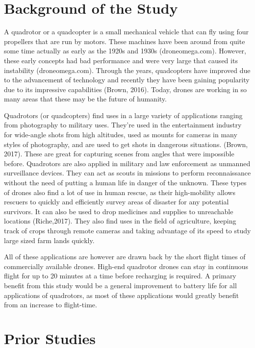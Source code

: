 \section{Background of the Study}

A quadrotor or a quadcopter is a small mechanical vehicle that can fly using four propellers that are run by motors. These machines have been around from quite some time actually as early as the 1920s and 1930s (droneomega.com). However, these early concepts had bad performance and were very large that caused its instability (droneomega.com). Through the years, quadcopters have improved due to the advancement of technology and recently they have been gaining popularity due to its impressive capabilities (Brown, 2016). Today, drones are working in so many areas that these may be the future of humanity.

Quadrotors (or quadcopters) find uses in a large variety of applications ranging from photography to military uses. They’re used in the entertainment industry for wide-angle shots from high altitudes, used as mounts for cameras in many styles of photography, and are used to get shots in dangerous situations. (Brown, 2017).  These are great for capturing scenes from angles that were impossible before. Quadrotors are also applied in military and law enforcement as unmanned surveillance devices. They can act as scouts in missions to perform reconnaissance without the need of putting a human life in danger of the unknown. These types of drones also find a lot of use in human rescue, as their high-mobility allows rescuers to quickly and efficiently survey areas of disaster for any potential survivors.  It can also be used to drop medicines and supplies to unreachable locations (Riche,2017). They also find uses in the field of agriculture, keeping track of crops through remote cameras and taking advantage of its speed to study large sized farm lands quickly.

All of these applications are however are drawn back by the short flight times of commercially available drones. High-end quadrotor drones can stay in continuous flight for up to 20 minutes at a time before recharging is required.  A primary benefit from this study would be a general improvement to battery life for all applications of quadrotors, as most of these applications would greatly benefit from an increase to flight-time.


\graytx{\Blindtext}


\section{Prior Studies}

